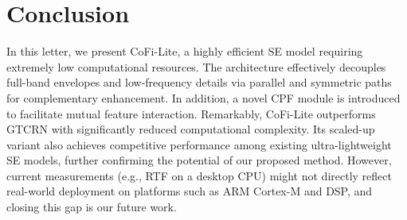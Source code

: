 \documentclass[journal]{IEEEtran}
\begin{document}
\section{Conclusion}
In this letter, we present CoFi-Lite, a highly efficient SE model requiring extremely low computational resources.
The architecture effectively decouples full-band envelopes and low-frequency details via parallel and symmetric paths for complementary enhancement.
In addition, a novel CPF module is introduced to facilitate mutual feature interaction.
Remarkably, CoFi-Lite outperforms GTCRN with significantly reduced computational complexity. 
Its scaled-up variant also achieves competitive performance among existing ultra-lightweight SE models, further confirming the potential of our proposed method. 
However, current measurements (e.g., RTF on a desktop CPU) might not directly reflect real-world deployment on platforms such as ARM Cortex-M and DSP, and closing this gap is our future work.



\end{document}
